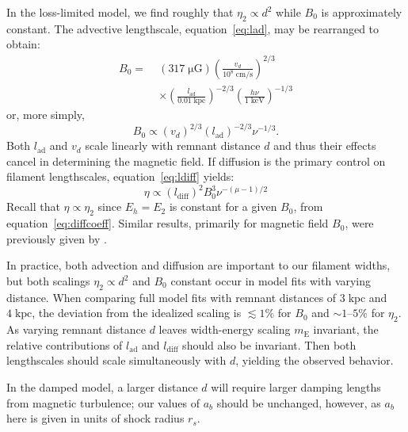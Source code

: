 \documentclass[iop, apj, numberedappendix]{emulateapj}
\newcommand*{\mt}{\mathrm}
\newcommand*{\unit}[1]{\;\mt{#1}}  %
\newcommand*{\abt}{\mathord{\sim}} %
\newcommand*{\mE}{m_\mt{E}}
\newcommand*{\muG}{\unit{\mu G}}
\begin{document}
In the loss-limited model, we find roughly that $\eta_2 \propto d^2$ while
$B_0$ is approximately constant.  The advective lengthscale,
equation~\eqref{eq:lad}, may be rearranged to obtain:
\begin{align}
    B_0 =\; &(317 \muG) \left(\frac{v_d}{10^8 \unit{cm/s}}\right)^{2/3}
                \nonumber \\
            &\times \left(\frac{l_{\mt{ad}}}{0.01 \unit{kpc}}\right)^{-2/3}
                \left(\frac{h\nu}{1 \unit{keV}}\right)^{-1/3}
\end{align}
or, more simply,
\begin{equation}
    B_0 \propto \left(v_d\right)^{2/3}
                \left(l_{\mt{ad}}\right)^{-2/3} \nu^{-1/3} .
\end{equation}
Both $l_{\mt{ad}}$ and $v_d$ scale linearly with remnant distance $d$ and thus
their effects cancel in determining the magnetic field.  If diffusion is the
primary control on filament lengthscales, equation~\eqref{eq:ldiff} yields:
\begin{equation}
    \eta \propto \left(l_{\mt{diff}}\right)^2 B_0^{3} \nu^{-(\mu - 1)/2}
\end{equation}
Recall that $\eta \propto \eta_2$ since $E_h = E_2$ is constant for a given
$B_0$, from equation~\eqref{eq:diffcoeff}.  Similar results, primarily for
magnetic field $B_0$, were previously given by \citet{parizot2006}.

In practice, both advection and diffusion are important to our filament widths,
but both scalings $\eta_2 \propto d^2$ and $B_0$ constant occur in model fits
with varying distance.  When comparing full model fits with remnant distances
of $3 \unit{kpc}$ and $4 \unit{kpc}$, the deviation from the idealized scaling
is $\lesssim 1 \%$ for $B_0$ and $\abt 1$--$5\%$ for $\eta_2$.  As varying
remnant distance $d$ leaves width-energy scaling $\mE$ invariant, the relative
contributions of $l_{\mt{ad}}$ and $l_{\mt{diff}}$ should also be invariant.
Then both lengthscales should scale simultaneously with $d$, yielding the
observed behavior.

In the damped model, a larger distance $d$ will require larger damping lengths
from magnetic turbulence; our values of $a_b$ should be unchanged, however, as
$a_b$ here is given in units of shock radius $r_s$.
\end{document}
